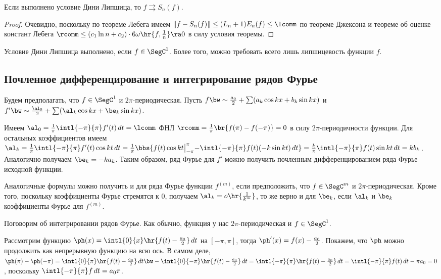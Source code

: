 \documentclass[a4paper]{article}
\newcommand{\intlop}{\intl{0}{\pi}}
\newcommand{\intlox}{\intl{0}{x}}
\newcommand{\intlpp}{\intl{-\pi}{\pi}}
\newcommand{\frpi}{\frac{1}{\pi}}
\newcommand{\sbs}[2]{\bigl|_{{#1}}^{{#2}}}
\begin{document}
\begin{theorem}
Если выполнено условие Дини Липшица, то $f \rightrightarrows S_n(f)$.
\end{theorem}
\begin{proof}
Очевидно, поскольку по теореме Лебега имеем $\|f-S_n(f)\| \le (L_n+1)E_n(f) \le \lcomm$ по теореме Джексона и теореме об
оценке констант Лебега $\rcomm \le (c_1\ln n + c_2)\cdot 6\omega\hr{f,\frac{1}{n}} \ra 0$ в силу условия теоремы.
\end{proof}

\begin{note}
Условие Дини Липшица выполнено, если $f \in\SegC^1$. Более того, можно требовать всего лишь липшицевость функции $f$.
\end{note}

\subsection{Почленное дифференцирование и интегрирование рядов Фурье}

Будем предполагать, что $f \in\SegC^1$ и $2\pi$-периодическая. Пусть $f \bw\sim \frac{a_0}{2} + \sum(a_k \cos kx + b_k \sin kx)$
и $f' \bw\sim \frac{\al_0}{2} + \sum (\al_k\cos kx + \be_k\sin kx)$.

Имеем $\al_0 = \frpi \intlpp f'(t)\,d t = \lcomm$ ФНЛ $\rcomm = \frpi \br{f(\pi)-f(-\pi)}=0$ в
силу $2\pi$-периодичности функции. Для остальных коэффициентов имеем $\al_k = \frpi \intlpp
f'(t)\cos kt \,d t = \frpi \bbs{f(t)\cos kt\sbs{-\pi}{\pi} - \intlpp f(t)(-k\sin kt)\,d t}=
\frac{k}{\pi}\intlpp f(t)\sin kt \,d t = k b_k$. Аналогично получаем $\be_k = -k a_k$. Таким
образом, ряд Фурье для $f'$ можно получить почленным дифференцированием ряда Фурье исходной
функции.

Аналогичные формулы можно получить и для ряда Фурье функции $f^{(m)}$, если предположить, что $f \in\SegC^m$ и $2\pi$-периодическая.
Кроме того, поскольку коэффициенты Фурье стремятся к 0, получаем $\al_k = o\hr{\frac{1}{k^m}}$, то же верно и для $\be_k$, если $\al_k$ и $\be_k$ коэффициенты Фурье для $f^{(m)}$.

Поговорим об интегрировании рядов Фурье. Как обычно, функция у нас $2\pi$-периодическая и $f \in\SegC^1$.

Рассмотрим функцию $\ph(x) = \intlox\hr{f(t) -\frac{a_0}{2}}\,dt$ на $[-\pi,\pi]$, тогда $\ph'(x)
= f(x) - \frac{a_0}{2}$. Покажем, что $\ph$ можно продолжить как непрерывную функцию на всю ось. В
самом деле, $\ph(\pi)-\ph(-\pi)=\intlop \hr{f(t)-\frac{a_0}{2}}\,dt \bw-
\intl{0}{-\pi}\hr{f(t)-\frac{a_0}{2}}\,d t= \intlpp \hr{f(t)-\frac{a_0}{2}}\,dt = \intlpp
f(t)\,d t - \pi a_0 = 0$, поскольку $\intlpp f \,d t = a_0\pi$.
\end{document}

